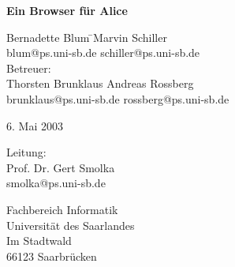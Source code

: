 \documentclass[12pt,a4paper]{article}
\begin{document}

\begin{titlepage}

\vspace*{\fill}
\begin{center}
\Huge{\bf{Ein Browser f\"{u}r Alice}}
\end{center}

\vspace{1cm}

\begin{center}
  \begin{minipage}[center]{10cm}
    \begin{tabbing} 
      \large{Bernadette Blum} \hspace{1cm}\= \large{Marvin Schiller}\\
      blum@ps.uni-sb.de \> schiller@ps.uni-sb.de\\[1cm]

      Betreuer: \\[2mm]
      \large{Thorsten Brunklaus} \> \large{Andreas Rossberg}\\
      brunklaus@ps.uni-sb.de \> rossberg@ps.uni-sb.de

    \end{tabbing}
  \end{minipage}
\end{center}

\vspace{5mm}
\begin{center}
\Large{6. Mai 2003}
\end{center}

\vspace{1cm}

\begin{center}
  \begin{minipage}[center]{5cm}
    Leitung:\\
    \large{Prof. Dr. Gert Smolka}\\
    smolka@ps.uni-sb.de
  \end{minipage}
\end{center}

\vspace{5mm}

\begin{center}
  \begin{minipage}[center]{5cm}
    Fachbereich Informatik\\
    Universit\"{a}t des Saarlandes\\
    Im Stadtwald \\
    66123 Saarbr\"{u}cken
  \end{minipage}
\end{center}

\vspace*{\fill}

\end{titlepage}
\end{document}
